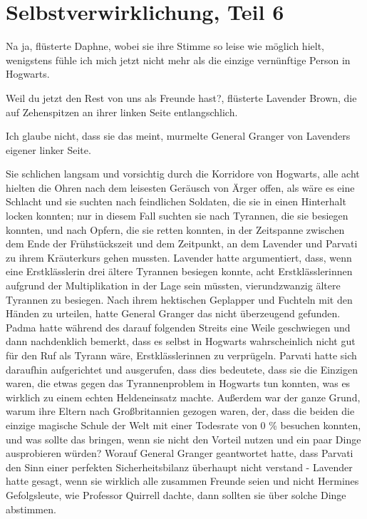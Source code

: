 \chapter{Selbstverwirklichung, Teil 6}

\glqq{}Na ja\grqq{}, flüsterte Daphne, wobei sie ihre Stimme so leise wie möglich
hielt, \glqq{}wenigstens fühle ich mich jetzt nicht mehr als die einzige
vernünftige Person in Hogwarts.\grqq{}

\glqq{}Weil du jetzt den Rest von uns als Freunde hast?\grqq{}, flüsterte
Lavender Brown, die auf Zehenspitzen an ihrer linken Seite entlangschlich.

\glqq{}Ich glaube nicht, dass sie das meint\grqq{}, murmelte General Granger von
Lavenders eigener linker Seite.

Sie schlichen langsam und vorsichtig durch die Korridore von Hogwarts, alle acht
hielten die Ohren nach dem leisesten Geräusch von Ärger offen, als wäre es eine
Schlacht und sie suchten nach feindlichen Soldaten, die sie in einen Hinterhalt
locken konnten; nur in diesem Fall suchten sie nach Tyrannen, die sie besiegen
konnten, und nach Opfern, die sie retten konnten, in der Zeitspanne zwischen dem
Ende der Frühstückszeit und dem Zeitpunkt, an dem Lavender und Parvati zu ihrem
Kräuterkurs gehen mussten. Lavender hatte argumentiert, dass, wenn eine
Erstklässlerin drei ältere Tyrannen besiegen konnte, acht Erstklässlerinnen
aufgrund der Multiplikation in der Lage sein müssten, vierundzwanzig ältere
Tyrannen zu besiegen. Nach ihrem hektischen Geplapper und Fuchteln mit den
Händen zu urteilen, hatte General Granger das nicht überzeugend gefunden. Padma
hatte während des darauf folgenden Streits eine Weile geschwiegen und dann
nachdenklich bemerkt, dass es selbst in Hogwarts wahrscheinlich nicht gut für
den Ruf als Tyrann wäre, Erstklässlerinnen zu verprügeln. Parvati hatte sich
daraufhin aufgerichtet und ausgerufen, dass dies bedeutete, dass sie die
Einzigen waren, die etwas gegen das Tyrannenproblem in Hogwarts tun konnten, was
es wirklich zu einem echten Heldeneinsatz machte. Außerdem war der ganze Grund,
warum ihre Eltern nach Großbritannien gezogen waren, der, dass die beiden die
einzige magische Schule der Welt mit einer Todesrate von 0 \% besuchen konnten,
und was sollte das bringen, wenn sie nicht den Vorteil nutzen und ein paar Dinge
ausprobieren würden? Worauf General Granger geantwortet hatte, dass Parvati den
Sinn einer perfekten Sicherheitsbilanz überhaupt nicht verstand - Lavender hatte
gesagt, wenn sie wirklich alle zusammen Freunde seien und nicht Hermines
Gefolgsleute, wie Professor Quirrell dachte, dann sollten sie über solche Dinge
abstimmen.

